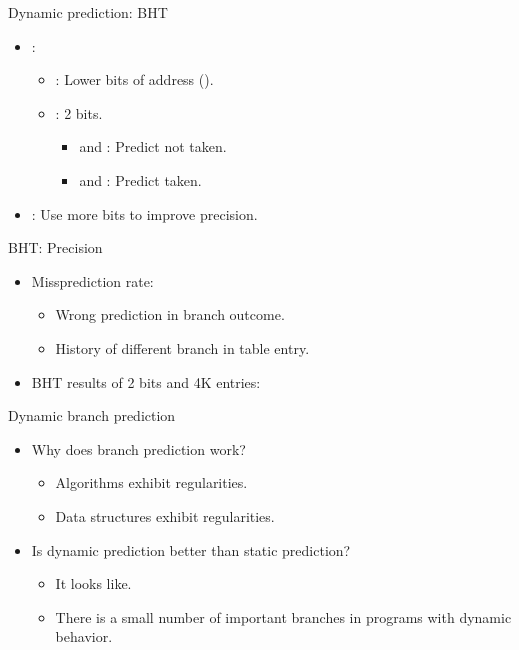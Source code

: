 \begin{frame}[t]{Dynamic prediction: BHT}
\begin{itemize}
  \item {}:
    \begin{itemize}
      \item {}: Lower bits of address ().
      \item {}: 2 bits. 
        \begin{itemize}
          \item {} and : Predict not taken.
          \item {} and : Predict taken.
        \end{itemize}
    \end{itemize}
\end{itemize}

\makebox[\textwidth][c]{

}
\begin{itemize}
  \item {}: Use more bits to improve precision.
\end{itemize}
\end{frame}

\begin{frame}[t,shrink=10]{BHT: Precision}
\begin{itemize}
  \item Missprediction rate:
    \begin{itemize}
      \item Wrong prediction in branch outcome.
      \item History of different branch in table entry.
    \end{itemize}
  \item BHT results of 2 bits and 4K entries:
\end{itemize}

\end{frame}

\begin{frame}[t]{Dynamic branch prediction}
\begin{itemize}
  \item Why does branch prediction work?
    \begin{itemize}
      \item Algorithms exhibit regularities.
      \item Data structures exhibit regularities.
    \end{itemize}

  \item Is dynamic prediction better than static prediction?
    \begin{itemize}
      \item It looks like.
      \item There is a small number of important branches in programs with dynamic behavior.
    \end{itemize}
\end{itemize}
\end{frame}
